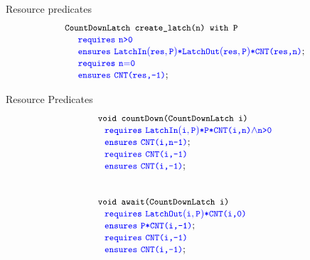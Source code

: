 \begin{frame}{Resource predicates}
\[
\begin{array}{l}
\code{\CDL~\createlatch(n)~with~P}\\
\SPEC{~~~~\requires~\code{n\sm{\gt}0}} \\
\SPEC{~~~~\ensures~ \LatchIn{res}{P} {\sep}\LatchOut{res}{P}{\sep}\code{CNT(res,n)}}; \\
\SPEC{~~~~\requires~\code{n\sm{=}0}} \\
\SPEC{~~~~\ensures~ \code{CNT(res,-1)}}; \\
\end{array}
\]
\end{frame}

\begin{frame}{Resource Predicates}
\[
\begin{array}{l}
\code{void~countDown(\CDL~i)}\\
~~
\SPEC{\requires~\LatchIn{i}{P}{\sep}\code{P}{\sep}\code{CNT(i,n)}\sm{\wedge}\code{n{>}0}}\\ 
~~ \SPEC{\ensures~ \code{CNT(i,n{-}1)}};\\ 
~~
\SPEC{\requires~\code{CNT(i,-1)}}\\
~~ \SPEC{\ensures~ \code{CNT(i,-1)}};\\
\\
\\
\code{void~await(\CDL~i)}\\
~~ \SPEC{\requires~\LatchOut{i}{P}{\sep}\code{CNT(i,0)}}\\
~~ \SPEC{\ensures~ \code{P}{\sep}\code{CNT(i,-1)}};\\
~~ \SPEC{\requires~\code{CNT(i,-1)}}\\
~~ \SPEC{\ensures~ \code{CNT(i,-1)}};%
\end{array}
\]
\end{frame}

